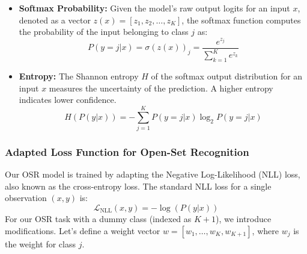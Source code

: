 \documentclass[11pt, a4paper]{article}
\begin{document}
\begin{itemize}
    \item \textbf{Softmax Probability:} Given the model's raw output logits for an input $x$, denoted as a vector $z(x) = [z_1, z_2, \ldots, z_K]$, the softmax function computes the probability of the input belonging to class $j$ as:
    \begin{equation}
        P(y=j|x) = \sigma(z(x))_j = \frac{e^{z_j}}{\sum_{k=1}^{K} e^{z_k}}
    \end{equation}
    \item \textbf{Entropy:} The Shannon entropy $H$ of the softmax output distribution for an input $x$ measures the uncertainty of the prediction. A higher entropy indicates lower confidence.
    \begin{equation}
        H(P(y|x)) = - \sum_{j=1}^{K} P(y=j|x) \log_2 P(y=j|x)
    \end{equation}
\end{itemize}

\subsubsection{Adapted Loss Function for Open-Set Recognition}
Our OSR model is trained by adapting the Negative Log-Likelihood (NLL) loss, also known as the cross-entropy loss. The standard NLL loss for a single observation $(x, y)$ is:
\begin{equation}
    \mathcal{L}_{\text{NLL}}(x, y) = -\log(P(y|x))
\end{equation}
For our OSR task with a dummy class (indexed as $K+1$), we introduce modifications. Let's define a weight vector $w = [w_1, \ldots, w_K, w_{K+1}]$, where $w_j$ is the weight for class $j$.
\end{document}
